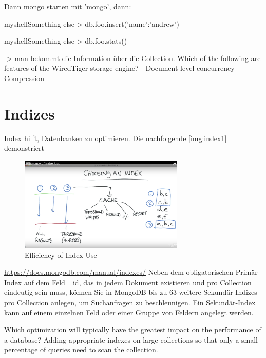 Dann mongo starten mit 'mongo', dann:

\begin{listingsbox}[label={lst:X}]{myshell}{Something else}
> db.foo.insert({'name':'andrew'})
\end{listingsbox}

\begin{listingsbox}[label={lst:X}]{myshell}{Something else}
> db.foo.stats()
\end{listingsbox}

 -> man bekommt die Information über die Collection.
Which of the following are features of the WiredTiger storage engine?\newline
- Document-level concurrency\newline
- Compression

\section{Indizes}
Index hilft, Datenbanken zu optimieren. Die nachfolgende \autoref{img:index1} demonstriert

\begin{figure}[H]
	\centering
	\includegraphics[width=0.7\textwidth]{resources/efficiencyOfIndexUse}
	\caption{Efficiency of Index Use}
	\label{img:index1}
\end{figure}

\url{https://docs.mongodb.com/manual/indexes/}
Neben dem obligatorischen Primär-Index auf dem Feld \_id, das in jedem Dokument existieren und pro Collection eindeutig sein muss, können Sie in MongoDB bis zu 63 weitere Sekundär-Indizes pro Collection anlegen, um Suchanfragen zu beschleunigen. Ein Sekundär-Index kann auf einem einzelnen Feld oder einer Gruppe von Feldern angelegt werden.%

Which optimization will typically have the greatest impact on the performance of a database?\newline
Adding appropriate indexes on large collections so that only a small percentage of queries need to scan the collection.

